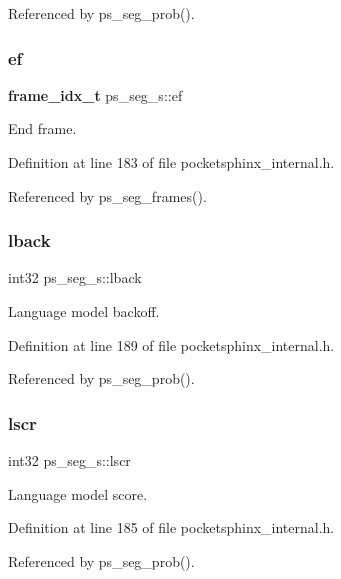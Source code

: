 Referenced by ps\+\_\+seg\+\_\+prob().

\mbox{\label{structps__seg__s_ab25ecc6af8d2695c6097cf7e934eadd4}} 
\subsubsection{ef}
{\footnotesize\ttfamily \textbf{ frame\+\_\+idx\+\_\+t} ps\+\_\+seg\+\_\+s\+::ef}



End frame. 



Definition at line 183 of file pocketsphinx\+\_\+internal.\+h.



Referenced by ps\+\_\+seg\+\_\+frames().

\mbox{\label{structps__seg__s_a4d86c21f1ed2dc3eb3b1b1b37ce9bb48}} 
\subsubsection{lback}
{\footnotesize\ttfamily int32 ps\+\_\+seg\+\_\+s\+::lback}



Language model backoff. 



Definition at line 189 of file pocketsphinx\+\_\+internal.\+h.



Referenced by ps\+\_\+seg\+\_\+prob().

\mbox{\label{structps__seg__s_a69e605f422eeed1a9c67437e8ddd8b08}} 
\subsubsection{lscr}
{\footnotesize\ttfamily int32 ps\+\_\+seg\+\_\+s\+::lscr}



Language model score. 



Definition at line 185 of file pocketsphinx\+\_\+internal.\+h.



Referenced by ps\+\_\+seg\+\_\+prob().

